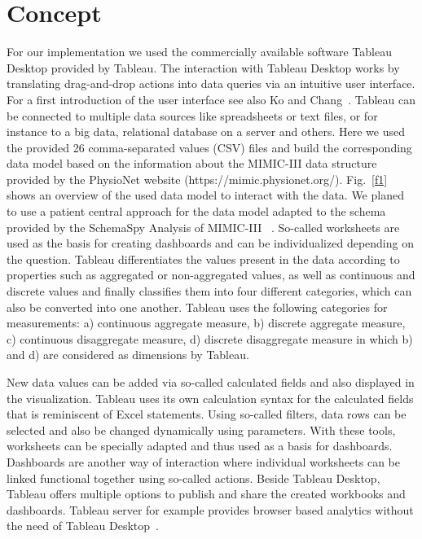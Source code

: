 \documentclass[aac,crcready]{iosart2x}
\begin{document}
\section{Concept}\label{s3}
%
For our implementation we used the commercially available software Tableau Desktop provided by Tableau\textregistered. The interaction with Tableau Desktop works by translating drag-and-drop actions into data queries via an intuitive user interface. For a first introduction of the user interface see also Ko and Chang~\cite{Ko.2017}. 
Tableau can be connected to multiple data sources like spreadsheets or text files, or for instance to a big data, relational database on a server and others. Here we used the provided 26 comma-separated values (CSV) files and build the corresponding data model based on the information about the MIMIC-III data structure provided by the PhysioNet website (https://mimic.physionet.org/). Fig.~\ref{f1} shows an overview of the used data model to interact with the data. We planed to use a patient central approach for the data model adapted to the schema provided by the SchemaSpy Analysis of MIMIC-III ~\cite{SchemaSpy.2017}. So-called worksheets are used as the basis for creating dashboards and can be individualized depending on the question.
Tableau differentiates the values present in the data according to properties such as aggregated or non-aggregated values, as well as continuous and discrete values and finally classifies them into four different categories, which can also be converted into one another. Tableau uses the following categories for measurements: a) continuous aggregate measure, b) discrete aggregate measure, c) continuous disaggregate measure, d) discrete disaggregate measure in which b) and d) are considered as dimensions by Tableau.


New data values can be added via so-called calculated fields and also displayed in the visualization. Tableau uses its own calculation syntax for the calculated fields that is reminiscent of Excel statements. Using so-called filters, data rows can be selected and also be changed dynamically using parameters. With these tools, worksheets can be specially adapted and thus used as a basis for dashboards. Dashboards are another way of interaction where individual worksheets can be linked functional together using so-called actions. Beside Tableau Desktop, Tableau offers multiple options to publish and share the created workbooks and dashboards. Tableau server for example provides browser based analytics without the need of Tableau Desktop~\cite{Tableau.20.03.2021}. 
\end{document}
